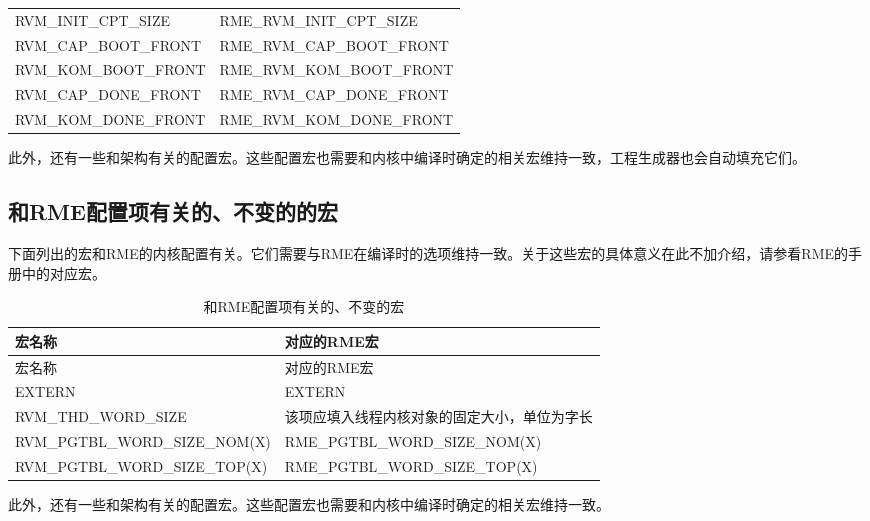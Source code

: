 \begin{xltabular}{\textwidth}{@{}>{\hsize\raggedright\arraybackslash}X>{\hsize\raggedright\arraybackslash}X@{}}
RVM\_\allowbreak{}INIT\_\allowbreak{}CPT\_\allowbreak{}SIZE & RME\_\allowbreak{}RVM\_\allowbreak{}INIT\_\allowbreak{}CPT\_\allowbreak{}SIZE\tabularnewline
RVM\_\allowbreak{}CAP\_\allowbreak{}BOOT\_\allowbreak{}FRONT & RME\_\allowbreak{}RVM\_\allowbreak{}CAP\_\allowbreak{}BOOT\_\allowbreak{}FRONT\tabularnewline
RVM\_\allowbreak{}KOM\_\allowbreak{}BOOT\_\allowbreak{}FRONT & RME\_\allowbreak{}RVM\_\allowbreak{}KOM\_\allowbreak{}BOOT\_\allowbreak{}FRONT\tabularnewline
RVM\_\allowbreak{}CAP\_\allowbreak{}DONE\_\allowbreak{}FRONT & RME\_\allowbreak{}RVM\_\allowbreak{}CAP\_\allowbreak{}DONE\_\allowbreak{}FRONT\tabularnewline
RVM\_\allowbreak{}KOM\_\allowbreak{}DONE\_\allowbreak{}FRONT & RME\_\allowbreak{}RVM\_\allowbreak{}KOM\_\allowbreak{}DONE\_\allowbreak{}FRONT\tabularnewline
\end{xltabular}

此外，还有一些和架构有关的配置宏。这些配置宏也需要和内核中编译时确定的相关宏维持一致，工程生成器也会自动填充它们。

\subsection{和RME配置项有关的、不变的的宏}\label{subsec:8-2-3}

下面列出的宏和RME的内核配置有关。它们需要与RME在编译时的选项维持一致。关于这些宏的具体意义在此不加介绍，请参看RME的手册中的对应宏。

\begin{xltabular}{\textwidth}{@{}>{\hsize\raggedright\arraybackslash}X>{\hsize\raggedright\arraybackslash}X@{}}
\caption{和RME配置项有关的、不变的宏}\label{tab:8-4}\\
\toprule
宏名称 & 对应的RME宏\tabularnewline
\endfirsthead
\toprule
宏名称 & 对应的RME宏\tabularnewline
\midrule
\endhead
\bottomrule
\endlastfoot
EXTERN & EXTERN\tabularnewline
RVM\_\allowbreak{}THD\_\allowbreak{}WORD\_\allowbreak{}SIZE &
该项应填入线程内核对象的固定大小，单位为字长\tabularnewline
RVM\_\allowbreak{}PGTBL\_\allowbreak{}WORD\_\allowbreak{}SIZE\_\allowbreak{}NOM(X) &
RME\_\allowbreak{}PGTBL\_\allowbreak{}WORD\_\allowbreak{}SIZE\_\allowbreak{}NOM(X)\tabularnewline
RVM\_\allowbreak{}PGTBL\_\allowbreak{}WORD\_\allowbreak{}SIZE\_\allowbreak{}TOP(X) &
RME\_\allowbreak{}PGTBL\_\allowbreak{}WORD\_\allowbreak{}SIZE\_\allowbreak{}TOP(X)\tabularnewline
\end{xltabular}

此外，还有一些和架构有关的配置宏。这些配置宏也需要和内核中编译时确定的相关宏维持一致。

